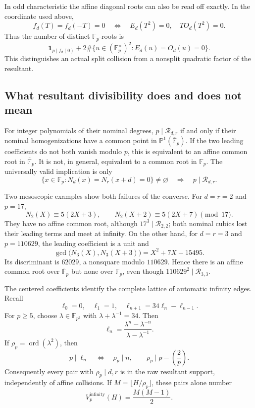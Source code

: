 In odd characteristic the affine diagonal roots can also be read off
exactly.  In the coordinate used above,
\[
 f_d(T)=f_d(-T)=0
 \quad\Longleftrightarrow\quad
 E_d(T^2)=0,\quad TO_d(T^2)=0.
\]
Thus the number of distinct $\mathbb F_p$-roots is
\begin{equation}\label{eq:meso-diagonal-root-count}
 \mathbf1_{p\mid f_d(0)}
 +2\#\{u\in(\mathbb F_p^\times)^2:E_d(u)=O_d(u)=0\}.
\end{equation}
This distinguishes an actual split collision from a nonsplit quadratic
factor of the resultant.

\subsection{What resultant divisibility does and does not mean}

\begin{proposition}\label{prop:meso-resultant-validity}
For integer polynomials of their nominal degrees,
$p\mid\mathcal R_{d,r}$ if and only if their nominal homogenizations
have a common point in $\mathbb P^1(\overline{\mathbb F}_p)$.  If the
two leading coefficients do not both vanish modulo $p$, this is
equivalent to an affine common root in $\overline{\mathbb F}_p$.
It is not, in general, equivalent to a common root in $\mathbb F_p$.
The universally valid implication is only
\[
 \{x\in\mathbb F_p:N_d(x)=N_r(x+d)=0\}\ne\varnothing
 \quad\Longrightarrow\quad p\mid\mathcal R_{d,r}.
\]
\end{proposition}

Two mesoscopic examples show both failures of the converse.
For $d=r=2$ and $p=17$,
\[
 N_2(X)\equiv5(2X+3),\qquad
 N_2(X+2)\equiv5(2X+7)\pmod {17}.
\]
They have no affine common root, although
$17^3\mid\mathcal R_{2,2}$; both nominal cubics lost their leading
terms and meet at infinity.  On the other hand, for $d=r=3$ and
$p=110629$, the leading coefficient is a unit and
\[
 \gcd\bigl(N_3(X),N_3(X+3)\bigr)
 =X^2+7X-15495.
\]
Its discriminant is $62029$, a nonsquare modulo $110629$.  Hence there
is an affine common root over $\overline{\mathbb F}_p$ but none over
$\mathbb F_p$, even though $110629^2\mid\mathcal R_{3,3}$.

The centered coefficients identify the complete lattice of automatic
infinity edges.  Recall
\[
 \ell_0=0,\quad\ell_1=1,\quad
 \ell_{n+1}=34\ell_n-\ell_{n-1}.
\]
For $p\geq5$, choose $\lambda\in\mathbb F_{p^2}$ with
$\lambda+\lambda^{-1}=34$.  Then
\[
 \ell_n=\frac{\lambda^n-\lambda^{-n}}
              {\lambda-\lambda^{-1}}.
\]
If $\rho_p=\operatorname {ord}(\lambda^2)$, then
\begin{equation}\label{eq:meso-rank-lattice}
 p\mid\ell_n\quad\Longleftrightarrow\quad\rho_p\mid n,
 \qquad \rho_p\mid p-\left(\frac2p\right).
\end{equation}
Consequently every pair with $\rho_p\mid d,r$ is in the raw resultant
support, independently of affine collisions.  If
$M=\lfloor H/\rho_p\rfloor$, these pairs alone number
\begin{equation}\label{eq:meso-infinity-count}
 V_p^{\mathrm{infinity}}(H)=\frac{M(M-1)}2.
\end{equation}


